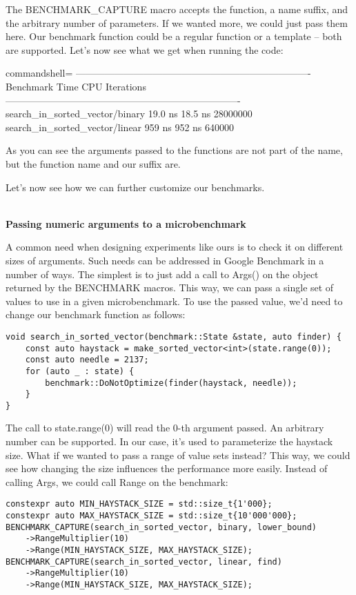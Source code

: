 The BENCHMARK\_CAPTURE macro accepts the function, a name suffix, and the arbitrary number of parameters. If we wanted more, we could just pass them here. Our benchmark function could be a regular function or a template – both are supported. Let's now see what we get when running the code:

\begin{tcblisting}{commandshell={}}
-------------------------------------------------------------------------
Benchmark Time CPU Iterations
-------------------------------------------------------------------------
search_in_sorted_vector/binary 19.0 ns 18.5 ns 28000000
search_in_sorted_vector/linear 959 ns 952 ns 640000
\end{tcblisting}

As you can see the arguments passed to the functions are not part of the name, but the function name and our suffix are.

Let's now see how we can further customize our benchmarks.

\hspace*{\fill} \\ %
\noindent
\textbf{Passing numeric arguments to a microbenchmark}

A common need when designing experiments like ours is to check it on different sizes of arguments. Such needs can be addressed in Google Benchmark in a number of ways. The simplest is to just add a call to Args() on the object returned by the BENCHMARK macros. This way, we can pass a single set of values to use in a given microbenchmark. To use the passed value, we'd need to change our benchmark function as follows:

\begin{lstlisting}[style=styleCXX]
void search_in_sorted_vector(benchmark::State &state, auto finder) {
	const auto haystack = make_sorted_vector<int>(state.range(0));
	const auto needle = 2137;
	for (auto _ : state) {
		benchmark::DoNotOptimize(finder(haystack, needle));
	}
}
\end{lstlisting}

The call to state.range(0) will read the 0-th argument passed. An arbitrary number can be supported. In our case, it's used to parameterize the haystack size. What if we wanted to pass a range of value sets instead? This way, we could see how changing the size influences the performance more easily. Instead of calling Args, we could call Range on the benchmark:

\begin{lstlisting}[style=styleCXX]
constexpr auto MIN_HAYSTACK_SIZE = std::size_t{1'000};
constexpr auto MAX_HAYSTACK_SIZE = std::size_t{10'000'000};
BENCHMARK_CAPTURE(search_in_sorted_vector, binary, lower_bound)
	->RangeMultiplier(10)
	->Range(MIN_HAYSTACK_SIZE, MAX_HAYSTACK_SIZE);
BENCHMARK_CAPTURE(search_in_sorted_vector, linear, find)
	->RangeMultiplier(10)
	->Range(MIN_HAYSTACK_SIZE, MAX_HAYSTACK_SIZE);
\end{lstlisting}

